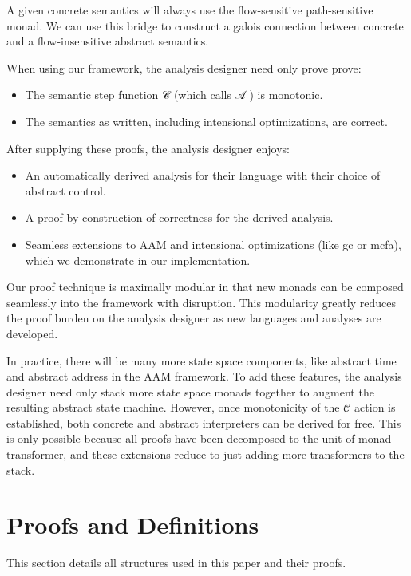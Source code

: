 \documentclass{article}
\begin{document}
A given concrete semantics will always use the flow-sensitive path-sensitive monad.
We can use this bridge to construct a galois connection between concrete and a flow-insensitive abstract semantics.

When using our framework, the analysis designer need only prove prove:
\begin{itemize}
\item The semantic step function 𝒞 (which calls 𝒜 ) is monotonic.
\item The semantics as written, including intensional optimizations, are correct.
\end{itemize}
After supplying these proofs, the analysis designer enjoys:
\begin{itemize}
\item An automatically derived analysis for their language with their choice of abstract control.
\item A proof-by-construction of correctness for the derived analysis.
\item 
  Seamless extensions to AAM and intensional optimizations (like gc or mcfa), which we demonstrate in our implementation.
\end{itemize}

Our proof technique is maximally modular in that new monads can be composed seamlessly into the framework with disruption.
This modularity greatly reduces the proof burden on the analysis designer as new languages and analyses are developed.

In practice, there will be many more state space components, like abstract time and abstract address in the AAM framework.
To add these features, the analysis designer need only stack more state space monads together to augment the resulting abstract state machine.
However, once monotonicity of the $𝒞$ action is established, both concrete and abstract interpreters can be derived for free.
This is only possible because all proofs have been decomposed to the unit of monad transformer, and these extensions reduce to just adding more transformers to the stack.



\section{Proofs and Definitions}
\label{section:Proofs+Definitions}

This section details all structures used in this paper and their proofs.
\end{document}
